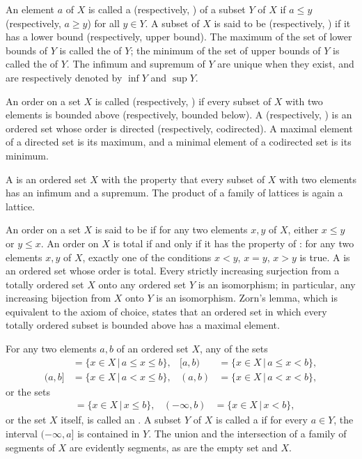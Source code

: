 \documentclass{article}
\begin{document}
An element \(a\) of \(X\) is called a 
(respectively, ) of a subset \(Y\) of \(X\) if
\(a \leq y\) (respectively, \(a \geq y\)) for all \(y \in Y\).  A
subset of \(X\) is said to be  (respectively,
) if it has a lower bound (respectively,
upper bound).  The maximum of the set of lower bounds of \(Y\) is
called the  of \(Y\); the minimum of the set of
upper bounds of \(Y\) is called the  of \(Y\).
The infimum and supremum of \(Y\) are unique when they exist, and are
respectively denoted by \(\inf Y\) and \(\sup Y\).

An order on a set \(X\) is called  (respectively,
) if every subset of \(X\) with two elements is
bounded above (respectively, bounded below).  A  (respectively, ) is an ordered set
whose order is directed (respectively, codirected).  A maximal element
of a directed set is its maximum, and a minimal element of a
codirected set is its minimum.

A  is an ordered set \(X\) with the property that
every subset of \(X\) with two elements has an infimum and a supremum.
The product of a family of lattices is again a lattice.

An order on a set \(X\) is said to be  if for any two
elements \(x, y\) of \(X\), either \(x \leq y\) or \(y \leq x\).  An
order on \(X\) is total if and only if it has the property of
: for any two elements \(x, y\) of \(X\),
exactly one of the conditions \(x < y\), \(x = y\), \(x > y\) is true.
A  is an ordered set whose order is
total.  Every strictly increasing surjection from a totally ordered
set \(X\) onto any ordered set \(Y\) is an isomorphism; in particular,
any increasing bijection from \(X\) onto \(Y\) is an isomorphism.
Zorn's lemma, which is equivalent to the axiom of choice, states that
an ordered set in which every totally ordered subset is bounded above
has a maximal element.

For any two elements \(a, b\) of an ordered set \(X\), any of the sets
\begin{align*}
  [a, b]& = \{ x \in X \,\vert\, a \leq x \leq b \},&
  [a, b)& = \{ x \in X \,\vert\, a \leq x < b \}, \\
  (a, b]& = \{ x \in X \,\vert\, a < x \leq b \},&
  (a, b)& = \{ x \in X \,\vert\, a < x < b \},
\end{align*}
or the sets
\begin{align*}
    [a, \infty)& = \{ x \in X \,\vert\, a \leq x \},&
  (a, \infty)& = \{ x \in X \,\vert\, a < x \}, \\
  (-\infty, b]& = \{ x \in X \,\vert\, x \leq b \},&
  (-\infty, b)& = \{ x \in X \,\vert\, x < b \},
\end{align*}
or the set \(X\) itself, is called an .  A subset
\(Y\) of \(X\) is called a  if for every
\(a \in Y\), the interval \((-\infty, a]\) is contained in \(Y\).  The
union and the intersection of a family of segments of \(X\) are
evidently segments, as are the empty set and \(X\).
\end{document}
